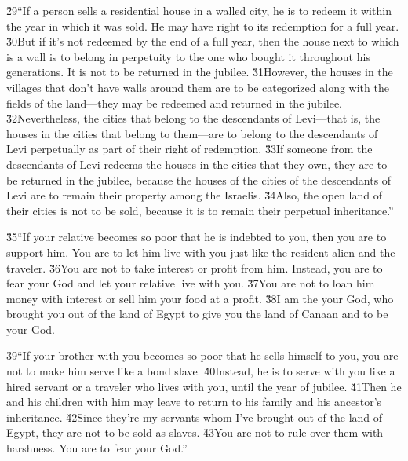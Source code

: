 \v{29}``If a person sells a residential house in a walled city, he is to redeem it within the year in which it was sold. He may have right to its redemption for a full year. \v{30}But if it's not redeemed by the end of a full year, then the house next to which is a wall is to belong in perpetuity to the one who bought it throughout his generations. It is not to be returned in the jubilee. \v{31}However, the houses in the villages that don't have walls around them are to be categorized along with the fields of the land---they may be redeemed and returned in the jubilee. \v{32}Nevertheless, the cities that belong to the descendants of Levi---that is, the houses in the cities that belong to them---are to belong to the descendants of Levi perpetually as part of their right of redemption. \v{33}If someone from the descendants of Levi redeems the houses in the cities that they own, they are to be returned in the jubilee, because the houses of the cities of the descendants of Levi are to remain their property among the Israelis. \v{34}Also, the open land of their cities is not to be sold, because it is to remain their perpetual inheritance.''

\v{35}``If your relative becomes so poor that he is indebted to you, then you are to support him. You are to let him live with you just like the resident alien and the traveler. \v{36}You are not to take interest or profit from him. Instead, you are to fear your God and let your relative live with you. \v{37}You are not to loan him money with interest or sell him your food at a profit. \v{38}I am the  your God, who brought you out of the land of Egypt to give you the land of Canaan and to be your God.

\v{39}``If your brother with you becomes so poor that he sells himself to you, you are not to make him serve like a bond slave. \v{40}Instead, he is to serve with you like a hired servant or a traveler who lives with you, until the year of jubilee. \v{41}Then he and his children with him may leave to return to his family and his ancestor's inheritance. \v{42}Since they're my servants whom I've brought out of the land of Egypt, they are not to be sold as slaves. \v{43}You are not to rule over them with harshness. You are to fear your God.''

